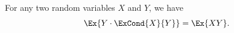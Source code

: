 \begin{lemma}
    For any two random variables $X$ and $Y$, we have
    \begin{equation*}
        \Ex{\bigl.Y \cdot \ExCond{X }{Y}} = \Ex{\bigl. X Y}.
    \end{equation*}
\end{lemma}
